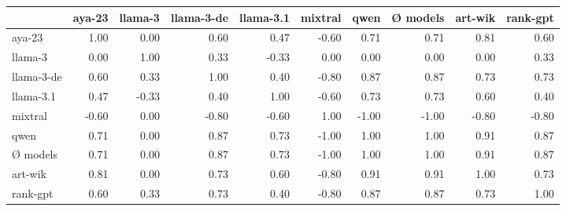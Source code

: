 \begin{tabular}{lrrrrrrrrr}
\toprule
 & aya-23 & llama-3 & llama-3-de & llama-3.1 & mixtral & qwen & Ø models & art-wik & rank-gpt \\
\midrule
aya-23 & 1.00 & 0.00 & 0.60 & 0.47 & -0.60 & 0.71 & 0.71 & 0.81 & 0.60 \\
llama-3 & 0.00 & 1.00 & 0.33 & -0.33 & 0.00 & 0.00 & 0.00 & 0.00 & 0.33 \\
llama-3-de & 0.60 & 0.33 & 1.00 & 0.40 & -0.80 & 0.87 & 0.87 & 0.73 & 0.73 \\
llama-3.1 & 0.47 & -0.33 & 0.40 & 1.00 & -0.60 & 0.73 & 0.73 & 0.60 & 0.40 \\
mixtral & -0.60 & 0.00 & -0.80 & -0.60 & 1.00 & -1.00 & -1.00 & -0.80 & -0.80 \\
qwen & 0.71 & 0.00 & 0.87 & 0.73 & -1.00 & 1.00 & 1.00 & 0.91 & 0.87 \\
Ø models & 0.71 & 0.00 & 0.87 & 0.73 & -1.00 & 1.00 & 1.00 & 0.91 & 0.87 \\
art-wik & 0.81 & 0.00 & 0.73 & 0.60 & -0.80 & 0.91 & 0.91 & 1.00 & 0.73 \\
rank-gpt & 0.60 & 0.33 & 0.73 & 0.40 & -0.80 & 0.87 & 0.87 & 0.73 & 1.00 \\
\bottomrule
\end{tabular}
